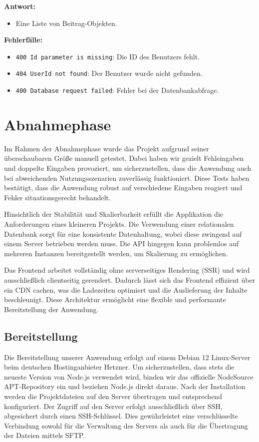\documentclass[a4paper,12pt]{article}
\begin{document}
\textbf{Antwort:}
\begin{itemize}
    \item Eine Liste von Beitrag-Objekten.
\end{itemize}

\textbf{Fehlerfälle:}
\begin{itemize}
    \item \texttt{400 Id parameter is missing}:
        Die ID des Benutzers fehlt.
    \item \texttt{404 UserId not found}:
        Der Benutzer wurde nicht gefunden.
    \item \texttt{400 Database request failed}:
        Fehler bei der Datenbankabfrage.
\end{itemize}

\newpage \section{Abnahmephase}

Im Rahmen der Abnahmephase wurde das Projekt aufgrund seiner überschaubaren
Größe manuell getestet. Dabei haben wir gezielt Fehleingaben und doppelte
Eingaben provoziert, um sicherzustellen, dass die Anwendung auch bei
abweichenden Nutzungsszenarien zuverlässig funktioniert. Diese Tests haben
bestätigt, dass die Anwendung robust auf verschiedene Eingaben reagiert und
Fehler situationsgerecht behandelt.

Hinsichtlich der Stabilität und Skalierbarkeit erfüllt die Applikation die
Anforderungen eines kleineren Projekts. Die Verwendung einer relationalen
Datenbank sorgt für eine konsistente Datenhaltung, wobei diese zwingend auf
einem Server betrieben werden muss. Die API hingegen kann problemlos auf
mehreren Instanzen bereitgestellt werden, um Skalierung zu ermöglichen.

Das Frontend arbeitet vollständig ohne serverseitiges Rendering (SSR) und wird
ausschließlich clientseitig gerendert. Dadurch lässt sich das Frontend
effizient über ein CDN cachen, was die Ladezeiten optimiert und die
Auslieferung der Inhalte beschleunigt. Diese Architektur ermöglicht eine
flexible und performante Bereitstellung der Anwendung.

\subsection{Bereitstellung}

Die Bereitstellung unserer Anwendung erfolgt auf einem Debian 12 Linux-Server
beim deutschen Hostinganbieter Hetzner. Um sicherzustellen, dass stets die
neueste Version von Node.js verwendet wird, binden wir das offizielle
NodeSource APT-Repository ein und beziehen Node.js direkt daraus. Nach der
Installation werden die Projektdateien auf den Server übertragen und
entsprechend konfiguriert. Der Zugriff auf den Server erfolgt ausschließlich
über SSH, abgesichert durch einen SSH-Schlüssel. Dies gewährleistet eine
verschlüsselte Verbindung sowohl für die Verwaltung des Servers als auch für
die Übertragung der Dateien mittels SFTP.
\end{document}
